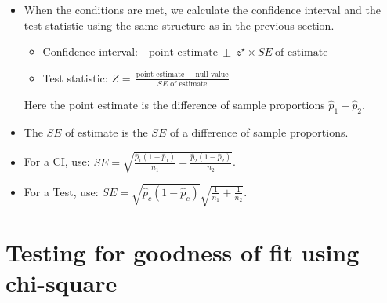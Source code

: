 \begin{itemize}
\item When the conditions are met, we calculate the confidence interval and the test statistic using the same structure as in the previous section.  

\begin{itemize}
\setlength{\itemsep}{2mm}
\item[] Confidence interval:\ \  $\text{point estimate}\ \pm\ z^{\star} \times SE\ \text{of estimate}$
\item[] Test statistic:  $Z = \frac{\text{point estimate } - \text{ null value}}{SE \text{ of estimate}}$ 
\end{itemize}
Here the point estimate is the difference of sample proportions $\hat{p}_1 - \hat{p}_2$.
\item[] The $SE$ of estimate is the $SE$ of a difference of sample proportions.
\item[] \quad \quad For a CI, use:  $SE = \sqrt{\frac{\hat{p}_1(1-\hat{p}_1)}{n_1} + \frac{\hat{p}_2(1-\hat{p}_2)}{n_2}}$.
\item[] \quad \quad For a Test, use:  $SE = \sqrt{\hat{p}_c(1-\hat{p}_c)}\sqrt{\frac{1}{n_1} + \frac{1}{n_2}}$.   
\end{itemize}


{}


\section[Testing for goodness of fit using chi-square]{Testing for goodness of fit using chi-square }

\label{oneWayChiSquare}

